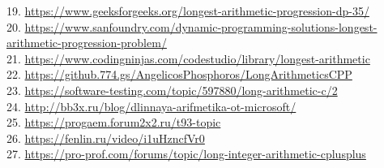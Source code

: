 \documentclass[a4paper]{article}
\begin{document}
\begin{flushleft}
19. \url{https://www.geeksforgeeks.org/longest-arithmetic-progression-dp-35/}\\
20. \url{https://www.sanfoundry.com/dynamic-programming-solutions-longest-arithmetic-progression-problem/}\\
21. \url{https://www.codingninjas.com/codestudio/library/longest-arithmetic}\\
22. \url{https://github.774.gs/AngelicosPhosphoros/LongArithmeticsCPP}\\
23. \url{https://software-testing.com/topic/597880/long-arithmetic-c/2}\\
24. \url{http://bb3x.ru/blog/dlinnaya-arifmetika-ot-microsoft/}\\
25. \url{https://progaem.forum2x2.ru/t93-topic}\\
26. \url{https://fenlin.ru/video/i1uHzncfVr0}\\
27. \url{https://pro-prof.com/forums/topic/long-integer-arithmetic-cplusplus}\\
\end{flushleft}
\end{document}
